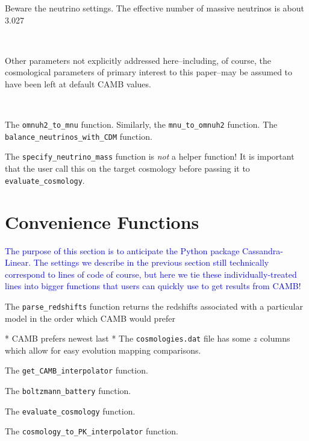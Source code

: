 Beware the neutrino settings. The effective number of massive neutrinos is about 3.027

\

Other parameters not explicitly addressed here--including, of course, the
cosmological parameters of primary interest to this paper--may be assumed to 
have been left at default CAMB values.

\


The \verb|omnuh2_to_mnu| function. Similarly, the \verb|mnu_to_omnuh2|
function. The \verb|balance_neutrinos_with_CDM| function.


The \verb|specify_neutrino_mass| function is \textit{not} a helper function!
It is important that the user call this on the target cosmology before passing
it to \verb|evaluate_cosmology|.

\section{Convenience Functions}


\textcolor{blue}{The purpose of this section is to anticipate the Python
package Cassandra-Linear. The settings we describe in the previous section
still technically correspond to lines of code of course, but here we tie these
individually-treated lines into bigger functions that users can quickly use to
get results from CAMB!}



The \verb|parse_redshifts| function returns the redshifts associated with a
particular model in the order which CAMB would prefer

* CAMB prefers newest last
* The \verb|cosmologies.dat| file has some $z$ columns which allow for easy
evolution mapping comparisons. %
	

The \verb|get_CAMB_interpolator| function.


The \verb|boltzmann_battery| function.

The \verb|evaluate_cosmology| function.

The \verb|cosmology_to_PK_interpolator| function.

